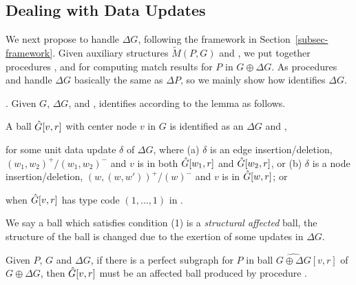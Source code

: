 \subsection{Dealing with Data Updates}
\label{subsec-Ginc}

We next propose \incd to handle $\Delta G$, following the framework in Section~\ref{subsec-framework}.
Given auxiliary structures $\tilde{M}(P,G)$ and \fb,
we put together procedures \identifyaffball, \incmatch and \comb for computing match results for $P$ in $G \oplus \Delta G$.
%
As procedures \incmatch and \comb handle $\Delta G$ basically the same as $\Delta P$, so we mainly show how \identifyaffball identifies \affballsx \wrt $\Delta G$.


.
Given $G$, $\Delta G$, and \fb, \identifyaffball identifies \affballsx according to the lemma as follows.

\begin{lemma}
\label{lemma-incgrdata-affballs}
A ball $\hat{G}{[v,r]}$ with center node $v$ in $G$ is identified as an \affballx \wrt $\Delta G$ and \fb,

 for some unit data update $\delta$ of $\Delta G$, where
(a) $\delta$ is an edge insertion/deletion, $(w_1,w_2)^+/(w_1,w_2)^-$ and $v$ is in  both $\hat{G}{[w_1,r]}$  and $\hat{G}{[w_2,r]}$, or
(b) $\delta$ is a node insertion/deletion, $(w,(w,w'))^+$/$(w)^-$ and $v$ is in $\hat{G}{[w,r]}$; or

 when $\hat{G}{[v,r]}$ has type code $(1,\ldots,1)$  in \fb.
\end{lemma}

We say a ball which satisfies condition (1) is a {\em structural affected} ball,
\ie the structure of the ball is changed due to the exertion of some updates in $\Delta G$.

\vspace{-0.5ex}
\begin{prop}
\label{prop-affected-datainc}
Given $P$, $G$ and $\Delta G$, if there is a perfect subgraph for $P$ in  ball $\widehat{G\oplus\Delta G}{[v,r]}$ of $G\oplus \Delta G$,
then $\hat{G}{[v,r]}$ must be an affected ball produced by procedure \identifyaffball.
\end{prop}


